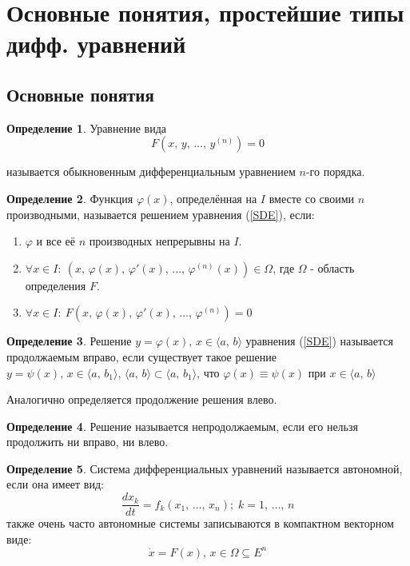 \documentclass[a4paper,12pt]{article}
\renewcommand{\phi}{\ensuremath{\varphi}}
\theoremstyle{plain}
\theoremstyle{definition}
\newtheorem{definition}{Определение}[section]
\theoremstyle{remark}
\begin{document}
\tableofcontents
\newpage

\section{Основные понятия, простейшие типы дифф. уравнений}
\subsection{Основные понятия}
\begin{definition}
	Уравнение вида
	\begin{equation}
		\label{SDE}
		F(x,\, y,\, \ldots,\, y^{(n)}) = 0
	\end{equation}

	называется обыкновенным дифференциальным уравнением $n$-го порядка.
\end{definition}

\begin{definition}
	Функция $\phi(x)$, определённая на $I$ вместе со своими $n$ производными, называется решением уравнения (\ref*{SDE}), если:

	\begin{enumerate}
		\item $\phi$ и все её $n$ производных непрерывны на $I$.
		\item $\forall x \in I:\: (x,\, \phi(x),\, \phi'(x),\, \ldots,\, \phi^{(n)}(x)) \in \Omega$, где $\Omega$ - область определения $F$.
		\item $\forall x \in I:\: F(x,\, \phi(x),\, \phi'(x),\,\ldots,\,\phi^{(n)}) = 0$
	\end{enumerate}
\end{definition}

\begin{definition}
	Решение $y = \phi(x),\, x \in \langle a,\, b\rangle$ уравнения (\ref*{SDE}) называется продолжаемым вправо, если существует такое решение $y = \psi(x),\, x \in \langle a,\, b_1 \rangle,\, \langle a,\, b\rangle \subset \langle a,\, b_1 \rangle$, что $\phi(x) \equiv \psi(x)$ при $x \in \langle a,\, b\rangle$

	Аналогично определяется продолжение решения влево.
\end{definition}

\begin{definition}
	Решение называется непродолжаемым, если его нельзя продолжить ни вправо, ни влево.
\end{definition}

\begin{definition}
	Система дифференциальных уравнений называется автономной, если она имеет вид:
	\[
		\frac{dx_k}{dt} = f_k(x_1,\, \ldots,\,x_n);\; k = 1,\,\ldots,\,n
	\]
	также очень часто автономные системы записываются в компактном векторном виде:
	\begin{equation}
		\label{Autonomius}
		\dot{x} = F(x),\, x \in \Omega \subseteq E^n
	\end{equation}

\end{definition}
\end{document}
